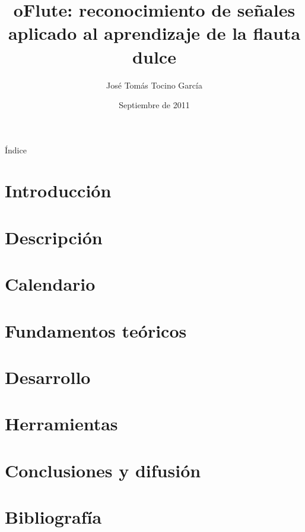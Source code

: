 \documentclass[11pt,xcolor=svgnames]{beamer}
\title{oFlute: reconocimiento de señales aplicado al aprendizaje de la flauta
  dulce}
\author{José Tomás Tocino García}
\institute[Universidad de Cádiz]{Universidad de Cádiz}
\date[Sept 2011]{Septiembre de 2011}
\begin{document}
{
  \begin{frame}
    \titlepage
  \end{frame}
}
\normalsize


\begin{frame}{Índice}
  \tableofcontents
\end{frame}


\section{Introducción}


\section{Descripción}


\section{Calendario}


\section{Fundamentos teóricos}


\section{Desarrollo}


\section{Herramientas}


\section{Conclusiones y difusión}


\section{Bibliografía}

\end{document}
